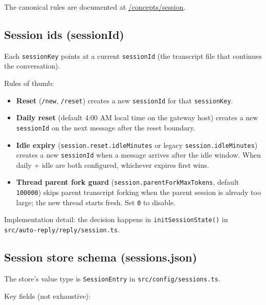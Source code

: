 The canonical rules are documented at \href{/concepts/session}{/concepts/session}.

\hrulefill


\subsection{Session ids (sessionId)}


Each \texttt{sessionKey} points at a current \texttt{sessionId} (the transcript file that continues the conversation).

Rules of thumb:

\begin{itemize}
  \item \textbf{Reset} (\texttt{/new}, \texttt{/reset}) creates a new \texttt{sessionId} for that \texttt{sessionKey}.
  \item \textbf{Daily reset} (default 4:00 AM local time on the gateway host) creates a new \texttt{sessionId} on the next message after the reset boundary.
  \item \textbf{Idle expiry} (\texttt{session.reset.idleMinutes} or legacy \texttt{session.idleMinutes}) creates a new \texttt{sessionId} when a message arrives after the idle window. When daily + idle are both configured, whichever expires first wins.
  \item \textbf{Thread parent fork guard} (\texttt{session.parentForkMaxTokens}, default \texttt{100000}) skips parent transcript forking when the parent session is already too large; the new thread starts fresh. Set \texttt{0} to disable.
\end{itemize}


Implementation detail: the decision happens in \texttt{initSessionState()} in \texttt{src/auto-reply/reply/session.ts}.

\hrulefill


\subsection{Session store schema (sessions.json)}


The store’s value type is \texttt{SessionEntry} in \texttt{src/config/sessions.ts}.

Key fields (not exhaustive):

